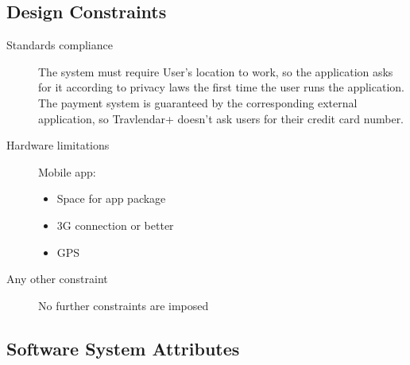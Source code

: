 \subsection{Design Constraints}
		\begin{description}
			\item[Standards compliance]
			The system must require User’s location to work, so the application asks for it according to privacy laws the first time the user runs the application.
			The payment system is guaranteed by the corresponding external application, so Travlendar+ doesn’t ask users for their credit card number.

			\item[Hardware limitations]
			Mobile app:
			\begin{itemize}
			\item Space for app package
			\item 3G connection or better
			\item GPS
		\end{itemize}

			\item[Any other constraint]
			No further constraints are imposed
\end{description}
		
\subsection{Software System Attributes}
	

